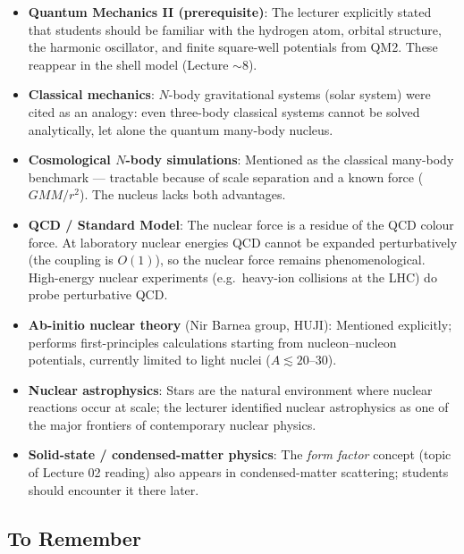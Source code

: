 \begin{itemize}
  \item \textbf{Quantum Mechanics II (prerequisite)}: The lecturer
    explicitly stated that students should be familiar with the
    hydrogen atom, orbital structure, the harmonic oscillator, and
    finite square-well potentials from QM2.  These reappear in the
    shell model (Lecture $\sim$8).
  \item \textbf{Classical mechanics}: $N$-body gravitational systems
    (solar system) were cited as an analogy: even three-body classical
    systems cannot be solved analytically, let alone the quantum
    many-body nucleus.
  \item \textbf{Cosmological $N$-body simulations}: Mentioned as the
    classical many-body benchmark — tractable because of scale
    separation and a known force ($GMM/r^{2}$). The nucleus lacks both
    advantages.
  \item \textbf{QCD / Standard Model}: The nuclear force is a residue
    of the QCD colour force.  At laboratory nuclear energies QCD
    cannot be expanded perturbatively (the coupling is $O(1)$), so
    the nuclear force remains phenomenological.  High-energy nuclear
    experiments (e.g.\ heavy-ion collisions at the LHC) do probe
    perturbative QCD.
  \item \textbf{Ab-initio nuclear theory} (Nir Barnea group, HUJI):
    Mentioned explicitly; performs first-principles calculations
    starting from nucleon--nucleon potentials, currently limited to
    light nuclei ($A \lesssim 20$--30).
  \item \textbf{Nuclear astrophysics}: Stars are the natural environment
    where nuclear reactions occur at scale; the lecturer identified
    nuclear astrophysics as one of the major frontiers of contemporary
    nuclear physics.
  \item \textbf{Solid-state / condensed-matter physics}: The
    \emph{form factor} concept (topic of Lecture 02 reading) also
    appears in condensed-matter scattering; students should encounter
    it there later.
\end{itemize}


\subsection*{To Remember}

